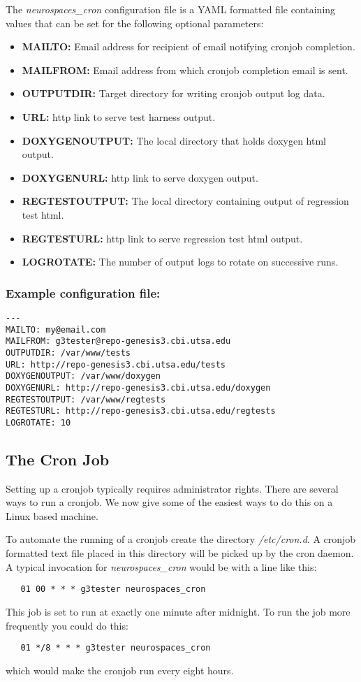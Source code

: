 \documentclass[12pt]{article}
\begin{document}
The  {\it neurospaces\_cron} configuration file is a YAML formatted file containing values that can be set for the following optional parameters:
\begin{itemize}
   \item[]{\bf MAILTO:} Email address for recipient of email notifying cronjob completion.
   \item[]{\bf MAILFROM:} Email address from which cronjob completion email is sent.
   \item[]{\bf OUTPUTDIR:} Target directory for writing cronjob output log data.
   \item[]{\bf URL:} http link to serve test harness output.
   \item[]{\bf DOXYGENOUTPUT:} The local directory that holds doxygen html output.
   \item[]{\bf DOXYGENURL:} http link to serve doxygen output.
   \item[]{\bf REGTESTOUTPUT:} The local directory containing output of regression test html.
   \item[]{\bf REGTESTURL:} http link to serve regression test html output.
   \item[]{\bf LOGROTATE:} The number of output logs to rotate on successive runs.
\end{itemize}

\subsubsection*{Example configuration file:}

\begin{verbatim}
---
MAILTO: my@email.com
MAILFROM: g3tester@repo-genesis3.cbi.utsa.edu
OUTPUTDIR: /var/www/tests
URL: http://repo-genesis3.cbi.utsa.edu/tests
DOXYGENOUTPUT: /var/www/doxygen
DOXYGENURL: http://repo-genesis3.cbi.utsa.edu/doxygen
REGTESTOUTPUT: /var/www/regtests
REGTESTURL: http://repo-genesis3.cbi.utsa.edu/regtests
LOGROTATE: 10

\end{verbatim}

\subsection*{The Cron Job}

Setting up a cronjob typically requires administrator rights. There are several ways to run a cronjob. We now give some of the easiest ways to do this on a Linux based machine.

To automate the running of a cronjob create the directory {\it /etc/cron.d}. A cronjob formatted text file placed in this directory will be picked up by the cron daemon. A typical invocation for {\it neurospaces\_cron} would be with a line like this:
\begin{verbatim}
   01 00 * * * g3tester neurospaces_cron
\end{verbatim}
This job is set to run at exactly one minute after midnight. To run the job more frequently you could do this:
\begin{verbatim}
   01 */8 * * * g3tester neurospaces_cron
\end{verbatim}
which would make the cronjob run every eight hours.
\end{document}
